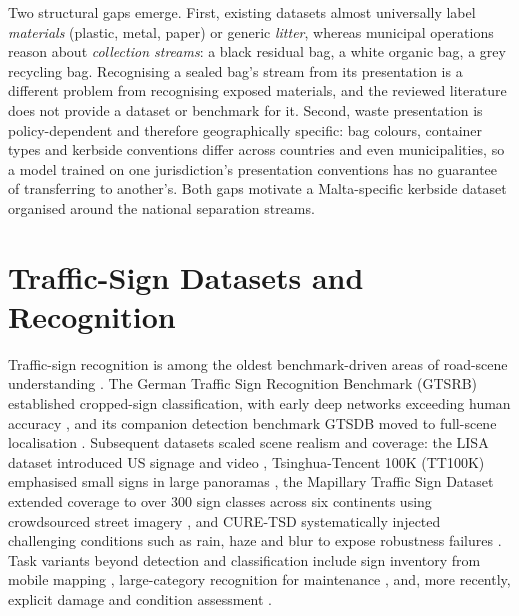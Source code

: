 Two structural gaps emerge. First, existing datasets almost universally label \emph{materials} (plastic, metal, paper) or generic \emph{litter}, whereas municipal operations reason about \emph{collection streams}: a black residual bag, a white organic bag, a grey recycling bag. Recognising a sealed bag's stream from its presentation is a different problem from recognising exposed materials, and the reviewed literature does not provide a dataset or benchmark for it. Second, waste presentation is policy-dependent and therefore geographically specific: bag colours, container types and kerbside conventions differ across countries and even municipalities, so a model trained on one jurisdiction's presentation conventions has no guarantee of transferring to another's. Both gaps motivate a Malta-specific kerbside dataset organised around the national separation streams.

\section{Traffic-Sign Datasets and Recognition}
\label{sec:lr-signs}

Traffic-sign recognition is among the oldest benchmark-driven areas of road-scene understanding \citep{mogelmose2012vision}. The German Traffic Sign Recognition Benchmark (GTSRB) established cropped-sign classification, with early deep networks exceeding human accuracy \citep{stallkamp2012man}, and its companion detection benchmark GTSDB moved to full-scene localisation \citep{houben2013detection}. Subsequent datasets scaled scene realism and coverage: the LISA dataset introduced US signage and video \citep{mogelmose2012vision}, Tsinghua-Tencent 100K (TT100K) emphasised small signs in large panoramas \citep{zhu2016traffic}, the Mapillary Traffic Sign Dataset extended coverage to over 300 sign classes across six continents using crowdsourced street imagery \citep{ertler2020mapillary}, and CURE-TSD systematically injected challenging conditions such as rain, haze and blur to expose robustness failures \citep{temel2020traffic}. Task variants beyond detection and classification include sign inventory from mobile mapping \citep{balali2015detection}, large-category recognition for maintenance \citep{tabernik2020deep}, and, more recently, explicit damage and condition assessment \citep{merolla2025improving}.

